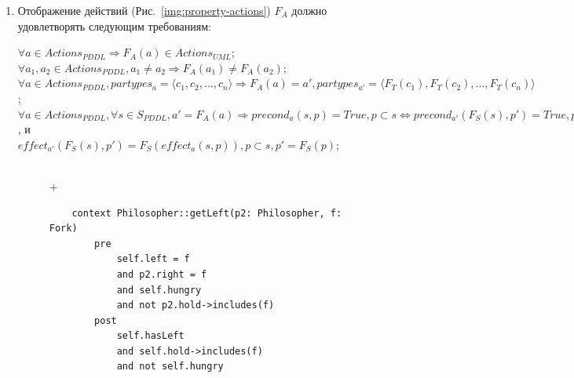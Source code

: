 \documentclass[a4paper,14pt]{extreport}
\begin{document}
\begin{enumerate}
        \item
    Отображение действий (Рис.~\ref{img:property-actions}) $F_A$ должно удовлетворять следующим требованиям:
    \begin{center}
        $\forall a \in Actions_{PDDL} \Rightarrow F_A(a) \in Actions_{UML}$; \\    
    
        $\forall a_1, a_2 \in Actions_{PDDL}, a_1 \neq a_2 \Rightarrow F_A(a_1) \neq F_A(a_2)$; \\        
 
        $\forall a \in Actions_{PDDL}, partypes_a = \langle c_1, c_2, ..., c_n \rangle \Rightarrow F_A(a) = a', partypes_{a'} = \langle F_T(c_1), F_T(c_2), ..., F_T(c_n)\rangle$; \\
 
        $\forall a \in Actions_{PDDL}, \forall s \in S_{PDDL}, a' = F_A(a) \Rightarrow precond_a(s, p) = True, p \subset s \Leftrightarrow precond_{a'}(F_S(s), p') = True, p' = F_S(p)$, и \\
        
        $effect_{a'}(F_S(s), p') = F_S(effect_a(s, p)), p \subset s, p' = F_S(p) $;
    \end{center}            
       
\begin{figure}[h]
    \begin{minipage}[h]{1\linewidth}
    \end{minipage} \\
    \vfill
    {\centering $+$ \\ \medskip } 
        \begin{minipage}[h]{0.43\linewidth}
        
           \begin{verbatim}
    context Philosopher::getLeft(p2: Philosopher, f: Fork)
        pre 
            self.left = f 
            and p2.right = f 
            and self.hungry 
            and not p2.hold->includes(f)
        post
            self.hasLeft
            and self.hold->includes(f)
            and not self.hungry
           \end{verbatim}
        \end{minipage}


\end{figure}
\end{enumerate}
\end{document}
